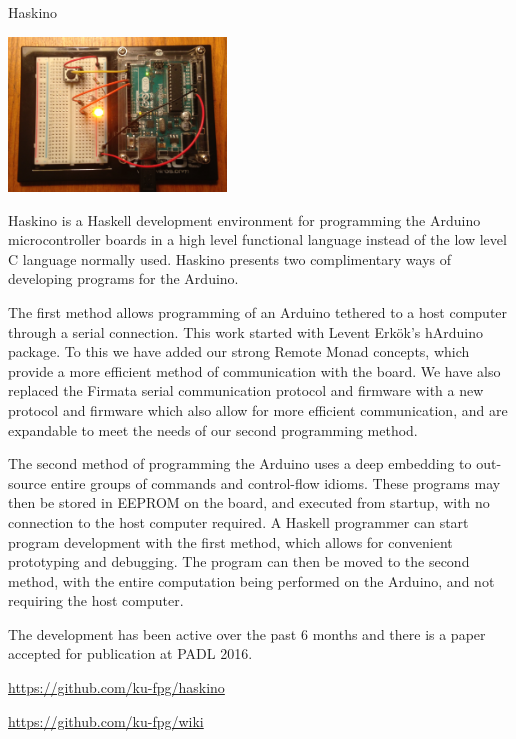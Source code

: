 \begin{hcarentry}{Haskino}
\label{Haskino}
\makeheader

\begin{center}
\includegraphics[width=0.435\textwidth]{html/Arduino.jpg}
\end{center}


Haskino is a Haskell development environment for programming the
Arduino microcontroller boards in a high level functional language
instead of the low level C language normally used.  Haskino presents
two complimentary ways of developing programs for the Arduino.

The first method allows programming of an Arduino tethered to a host
computer through a serial connection.  This work started with Levent
Erk\"{o}k's hArduino package.  To this we have added our strong Remote
Monad concepts, which provide a more efficient method of communication
with the board.  We have also replaced the Firmata serial
communication protocol and firmware with a new protocol and firmware
which also allow for more efficient communication, and are expandable
to meet the needs of our second programming method.

The second method of programming the Arduino uses a deep embedding to
out-source entire groups of commands and control-flow idioms.  These
programs may then be stored in EEPROM on the board, and executed from
startup, with no connection to the host computer required.  A Haskell
programmer can start program development with the first method, which
allows for convenient prototyping and debugging.  The program can then
be moved to the second method, with the entire computation being
performed on the Arduino, and not requiring the host computer.

The development has been active over the past 6 months and there is a
paper accepted for publication at PADL 2016.

\FurtherReading
\begin{compactitem}
\item
  \url{https://github.com/ku-fpg/haskino}
\item
  \url{https://github.com/ku-fpg/wiki}
\end{compactitem}
\end{hcarentry}
